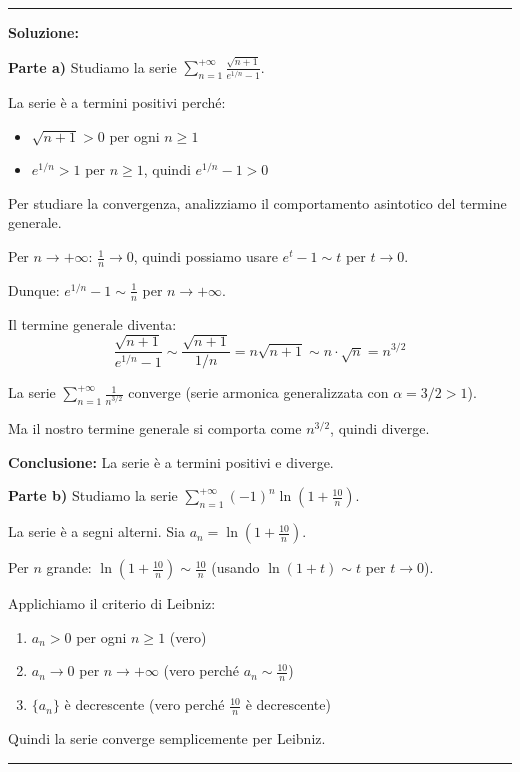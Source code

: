 \documentclass[12pt, a4paper]{article}
\newenvironment{solution}
{\par\noindent\rule{\textwidth}{0.4pt}\par\textbf{Soluzione:}\medskip\par}
{\par\rule{\textwidth}{0.4pt}\par\bigskip}
\begin{document}
\begin{solution}
\textbf{Parte a)} Studiamo la serie $\displaystyle\sum_{n=1}^{+\infty} \frac{\sqrt{n+1}}{e^{1/n}-1}$.

La serie è a termini positivi perché:
\begin{itemize}
    \item $\sqrt{n+1} > 0$ per ogni $n \geq 1$
    \item $e^{1/n} > 1$ per $n \geq 1$, quindi $e^{1/n} - 1 > 0$
\end{itemize}

Per studiare la convergenza, analizziamo il comportamento asintotico del termine generale.

Per $n \to +\infty$: $\frac{1}{n} \to 0$, quindi possiamo usare $e^t - 1 \sim t$ per $t \to 0$.

Dunque: $e^{1/n} - 1 \sim \frac{1}{n}$ per $n \to +\infty$.

Il termine generale diventa:
\[
\frac{\sqrt{n+1}}{e^{1/n}-1} \sim \frac{\sqrt{n+1}}{1/n} = n\sqrt{n+1} \sim n \cdot \sqrt{n} = n^{3/2}
\]

La serie $\displaystyle\sum_{n=1}^{+\infty} \frac{1}{n^{3/2}}$ converge (serie armonica generalizzata con $\alpha = 3/2 > 1$).

Ma il nostro termine generale si comporta come $n^{3/2}$, quindi diverge.

\textbf{Conclusione:} La serie è a termini positivi e diverge.

\vspace{0.5cm}

\textbf{Parte b)} Studiamo la serie $\displaystyle\sum_{n=1}^{+\infty} (-1)^{n} \ln\left(1+\frac{10}{n}\right)$.

La serie è a segni alterni. Sia $a_n = \ln\left(1+\frac{10}{n}\right)$.

Per $n$ grande: $\ln\left(1+\frac{10}{n}\right) \sim \frac{10}{n}$ (usando $\ln(1+t) \sim t$ per $t \to 0$).

Applichiamo il criterio di Leibniz:
\begin{enumerate}
    \item $a_n > 0$ per ogni $n \geq 1$ (vero)
    \item $a_n \to 0$ per $n \to +\infty$ (vero perché $a_n \sim \frac{10}{n}$)
    \item $\{a_n\}$ è decrescente (vero perché $\frac{10}{n}$ è decrescente)
\end{enumerate}

Quindi la serie converge semplicemente per Leibniz.


\end{solution}
\end{document}
